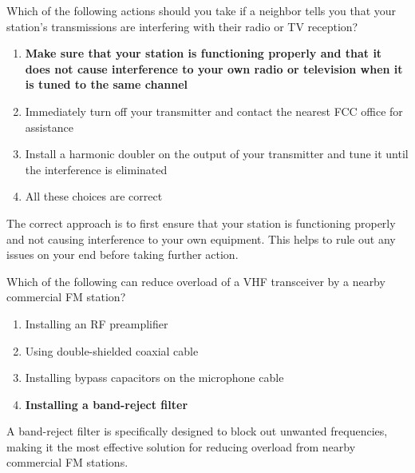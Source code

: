 \begin{tcolorbox}[colback=gray!10!white,colframe=black!75!black,title={T7B06}]
    Which of the following actions should you take if a neighbor tells you that your station’s transmissions are interfering with their radio or TV reception?
    \begin{enumerate}[label=\Alph*),noitemsep]
        \item \textbf{Make sure that your station is functioning properly and that it does not cause interference to your own radio or television when it is tuned to the same channel}
        \item Immediately turn off your transmitter and contact the nearest FCC office for assistance
        \item Install a harmonic doubler on the output of your transmitter and tune it until the interference is eliminated
        \item All these choices are correct
    \end{enumerate}
\end{tcolorbox}

The correct approach is to first ensure that your station is functioning properly and not causing interference to your own equipment. This helps to rule out any issues on your end before taking further action.

\begin{tcolorbox}[colback=gray!10!white,colframe=black!75!black,title={T7B07}]
    Which of the following can reduce overload of a VHF transceiver by a nearby commercial FM station?
    \begin{enumerate}[label=\Alph*),noitemsep]
        \item Installing an RF preamplifier
        \item Using double-shielded coaxial cable
        \item Installing bypass capacitors on the microphone cable
        \item \textbf{Installing a band-reject filter}
    \end{enumerate}
\end{tcolorbox}

A band-reject filter is specifically designed to block out unwanted frequencies, making it the most effective solution for reducing overload from nearby commercial FM stations.

